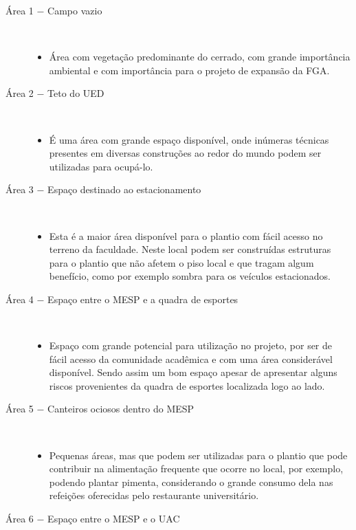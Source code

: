  \begin{description}
    \item[Área 1 $-$ Campo vazio] \
      \begin{itemize}
        \item Área com vegetação predominante do cerrado, com grande import\^{a}ncia ambiental e com import\^{a}ncia para o projeto de
          expansão da FGA.
      \end{itemize}
    \item[Área 2 $-$ Teto do UED] \
      \begin{itemize}
        \item É uma área com grande espaço disponível, onde inúmeras técnicas presentes em diversas construções ao redor do mundo podem
          ser utilizadas para ocupá-lo.
      \end{itemize}
    \item[Área 3 $-$ Espaço destinado ao estacionamento] \
      \begin{itemize}
        \item Esta é a maior área disponível para o plantio com fácil acesso no terreno da faculdade. Neste local podem ser construídas
          estruturas para o plantio que não afetem o piso local e que tragam algum benefício, como por exemplo sombra para os veículos
          estacionados.
      \end{itemize}
    \item[Área 4 $-$ Espaço entre o MESP e a quadra de esportes] \
      \begin{itemize}
        \item Espaço com grande potencial para utilização no projeto, por ser de fácil acesso da comunidade acadêmica e com uma área
          considerável disponível. Sendo assim um bom espaço apesar de apresentar alguns riscos provenientes da quadra de esportes localizada logo ao lado.
      \end{itemize}
    \item[Área 5 $-$ Canteiros ociosos dentro do MESP] \
      \begin{itemize}
        \item Pequenas áreas, mas que podem ser utilizadas para o plantio que pode contribuir na alimentação frequente que ocorre no local, por exemplo, podendo plantar pimenta, considerando o grande consumo dela nas refeições oferecidas pelo restaurante universitário.
      \end{itemize}
    \item[Área 6 $-$ Espaço entre o MESP e o UAC] \

\end{description}
